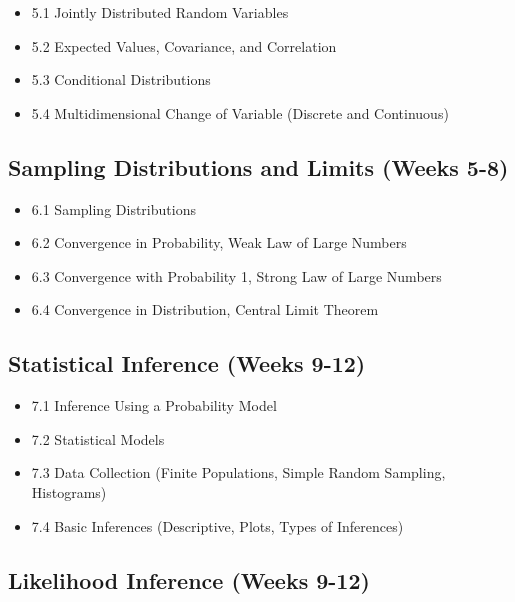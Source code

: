 \documentclass[]{book}
\providecommand{\tightlist}{%
  \setlength{\itemsep}{0pt}\setlength{\parskip}{0pt}}
\theoremstyle{definition}
\theoremstyle{definition}
\theoremstyle{definition}
\theoremstyle{remark}
\begin{document}
\begin{itemize}
\tightlist
\item
  5.1 Jointly Distributed Random Variables
\item
  5.2 Expected Values, Covariance, and Correlation
\item
  5.3 Conditional Distributions
\item
  5.4 Multidimensional Change of Variable (Discrete and Continuous)
\end{itemize}

\subsection*{Sampling Distributions and Limits (Weeks
5-8)}\label{sampling-distributions-and-limits-weeks-5-8}

\begin{itemize}
\tightlist
\item
  6.1 Sampling Distributions
\item
  6.2 Convergence in Probability, Weak Law of Large Numbers
\item
  6.3 Convergence with Probability 1, Strong Law of Large Numbers\\
\item
  6.4 Convergence in Distribution, Central Limit Theorem
\end{itemize}

\subsection*{Statistical Inference (Weeks
9-12)}\label{statistical-inference-weeks-9-12}

\begin{itemize}
\tightlist
\item
  7.1 Inference Using a Probability Model\\
\item
  7.2 Statistical Models\\
\item
  7.3 Data Collection (Finite Populations, Simple Random Sampling,
  Histograms)\\
\item
  7.4 Basic Inferences (Descriptive, Plots, Types of Inferences)
\end{itemize}

\subsection*{Likelihood Inference (Weeks
9-12)}\label{likelihood-inference-weeks-9-12}
\end{document}
